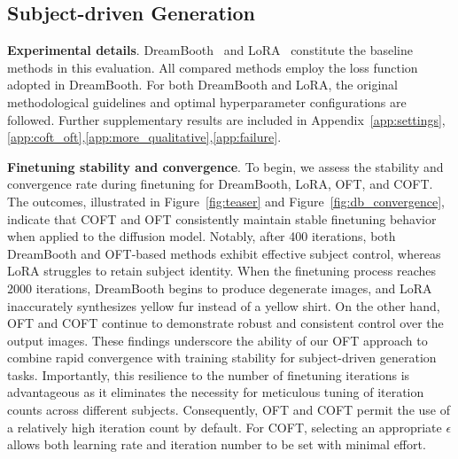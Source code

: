 \subsection{Subject-driven Generation}

\textbf{Experimental details}. DreamBooth~\cite{ruiz2023dreambooth} and LoRA~\cite{hulora2022} constitute the baseline methods in this evaluation. All compared methods employ the loss function adopted in DreamBooth. For both DreamBooth and LoRA, the original methodological guidelines and optimal hyperparameter configurations are followed. Further supplementary results are included in Appendix~\ref{app:settings},\ref{app:coft_oft},\ref{app:more_qualitative},\ref{app:failure}.

\textbf{Finetuning stability and convergence}. To begin, we assess the stability and convergence rate during finetuning for DreamBooth, LoRA, OFT, and COFT. The outcomes, illustrated in Figure~\ref{fig:teaser} and Figure~\ref{fig:db_convergence}, indicate that COFT and OFT consistently maintain stable finetuning behavior when applied to the diffusion model. Notably, after 400 iterations, both DreamBooth and OFT-based methods exhibit effective subject control, whereas LoRA struggles to retain subject identity. When the finetuning process reaches 2000 iterations, DreamBooth begins to produce degenerate images, and LoRA inaccurately synthesizes yellow fur instead of a yellow shirt. On the other hand, OFT and COFT continue to demonstrate robust and consistent control over the output images. These findings underscore the ability of our OFT approach to combine rapid convergence with training stability for subject-driven generation tasks. Importantly, this resilience to the number of finetuning iterations is advantageous as it eliminates the necessity for meticulous tuning of iteration counts across different subjects. Consequently, OFT and COFT permit the use of a relatively high iteration count by default. For COFT, selecting an appropriate $\epsilon$ allows both learning rate and iteration number to be set with minimal effort.

